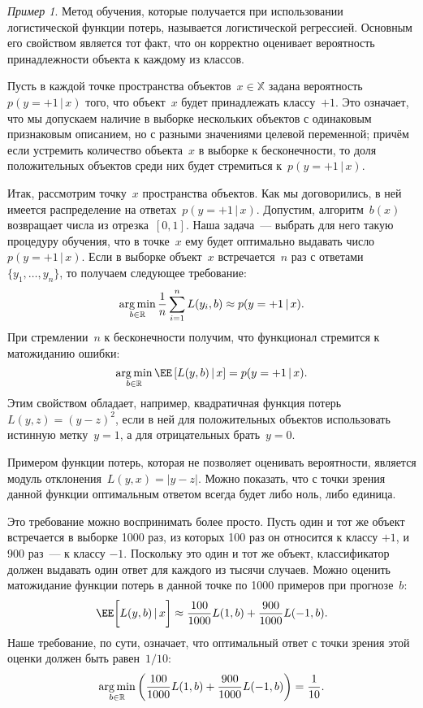 \documentclass[a4paper, 12pt]{article}
\newcommand{\argmin}{\mathop{\rm arg\,min}\limits}
\newcommand{\cond}{\mspace{3mu}{|}\mspace{3mu}}
\def\XX{\mathbb{X}}
\def\RR{\mathbb{R}}
\theoremstyle{plain} %
\theoremstyle{definition} %
\theoremstyle{remark} %
\newtheorem{example}{Пример}
\begin{document}
\begin{example}
Метод обучения, которые получается при использовании логистической функции потерь,
называется логистической регрессией.
Основным его свойством является тот факт, что он корректно оценивает вероятность
принадлежности объекта к каждому из классов.

Пусть в каждой точке пространства объектов~$x \in \XX$ задана вероятность~$p(y = +1 \cond x)$
того, что объект~$x$ будет принадлежать классу~$+1$.
Это означает, что мы допускаем наличие в выборке нескольких объектов
с одинаковым признаковым описанием, но с разными значениями целевой переменной;
причём если устремить количество объекта~$x$ в выборке к бесконечности,
то доля положительных объектов среди них будет стремиться к~$p(y = +1 \cond x)$.

Итак, рассмотрим точку~$x$ пространства объектов.
Как мы договорились, в ней имеется распределение на ответах~$p(y = +1 \cond x)$.
Допустим, алгоритм~$b(x)$ возвращает числа из отрезка~$[0, 1]$.
Наша задача~--- выбрать для него такую процедуру обучения, что в точке~$x$
ему будет оптимально выдавать число~$p(y = +1 \cond x)$.
Если в выборке объект~$x$ встречается~$n$ раз с ответами~$\{y_1, \dots, y_n\}$,
то получаем следующее требование:
\[
    \argmin_{b \in \RR}
    \frac{1}{n}
    \sum_{i = 1}^{n}
        L(y_i, b)
    \approx
    p(y = +1 \cond x).
\]
При стремлении~$n$ к бесконечности получим, что функционал стремится к матожиданию ошибки:
\[
    \argmin_{b \in \RR}
    \EE \left[
        L(y, b)
        \cond
        x
    \right]
    =
    p(y = +1 \cond x).
\]
Этим свойством обладает, например, квадратичная функция потерь~$L(y, z) = (y - z)^2$,
если в ней для положительных объектов использовать истинную метку~$y = 1$, а для отрицательных брать~$y = 0$.

Примером функции потерь, которая не позволяет оценивать вероятности, является модуль отклонения~$L(y, x) = |y - z|$.
Можно показать, что с точки зрения данной функции оптимальным ответом всегда будет либо ноль, либо единица.

Это требование можно воспринимать более просто.
Пусть один и тот же объект встречается в выборке 1000 раз,
из которых 100 раз он относится к классу $+1$, и 900 раз~--- к классу $-1$.
Поскольку это один и тот же объект, классификатор должен выдавать один ответ
для каждого из тысячи случаев.
Можно оценить матожидание функции потерь в данной точке по 1000 примеров при прогнозе~$b$:
\[
    \EE \biggl[
        L(y, b)
        \cond
        x
    \biggr]
    \approx
    \frac{100}{1000}
    L(1, b)
    +
    \frac{900}{1000}
    L(-1, b).
\]
Наше требование, по сути, означает, что оптимальный ответ
с точки зрения этой оценки должен быть равен~$1/10$:
\[
    \argmin_{b \in \RR} \left(
        \frac{100}{1000} L(1, b)
        +
        \frac{900}{1000} L(-1, b)
    \right)
    =
    \frac{1}{10}.
\]


\end{example}
\end{document}
